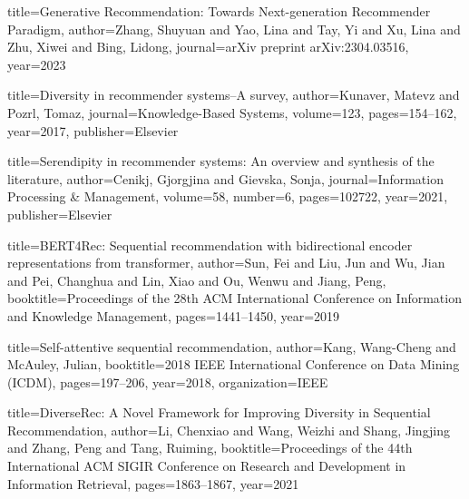 \documentclass[12pt,letterpaper]{article}
\begin{document}

\begin{thebibliography}{99}

title={Generative Recommendation: Towards Next-generation Recommender Paradigm},
  author={Zhang, Shuyuan and Yao, Lina and Tay, Yi and Xu, Lina and Zhu, Xiwei and Bing, Lidong},
  journal={arXiv preprint arXiv:2304.03516},
  year={2023}


title={Diversity in recommender systems--A survey},
  author={Kunaver, Matevz and Pozrl, Tomaz},
  journal={Knowledge-Based Systems},
  volume={123},
  pages={154--162},
  year={2017},
  publisher={Elsevier}


title={Serendipity in recommender systems: An overview and synthesis of the literature},
  author={Cenikj, Gjorgjina and Gievska, Sonja},
  journal={Information Processing & Management},
  volume={58},
  number={6},
  pages={102722},
  year={2021},
  publisher={Elsevier}


title={BERT4Rec: Sequential recommendation with bidirectional encoder representations from transformer},
  author={Sun, Fei and Liu, Jun and Wu, Jian and Pei, Changhua and Lin, Xiao and Ou, Wenwu and Jiang, Peng},
  booktitle={Proceedings of the 28th ACM International Conference on Information and Knowledge Management},
  pages={1441--1450},
  year={2019}


title={Self-attentive sequential recommendation},
  author={Kang, Wang-Cheng and McAuley, Julian},
  booktitle={2018 IEEE International Conference on Data Mining (ICDM)},
  pages={197--206},
  year={2018},
  organization={IEEE}


title={DiverseRec: A Novel Framework for Improving Diversity in Sequential Recommendation},
  author={Li, Chenxiao and Wang, Weizhi and Shang, Jingjing and Zhang, Peng and Tang, Ruiming},
  booktitle={Proceedings of the 44th International ACM SIGIR Conference on Research and Development in Information Retrieval},
  pages={1863--1867},
  year={2021}


\end{thebibliography}
\end{document}
